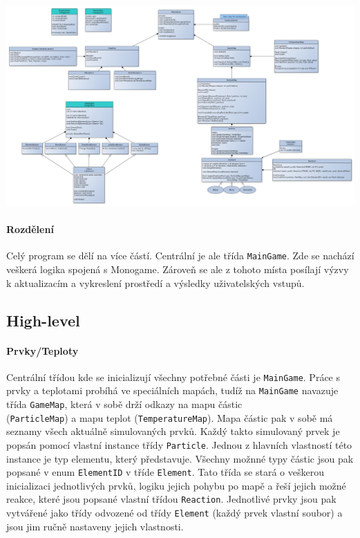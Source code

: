 \documentclass[a4paper, 12pt]{article}
\begin{document}
\begin{center}
    \hspace*{-80px}
    \includegraphics[width=1.4\linewidth]{GrainSim-graph.jpg}
\end{center}

\paragraph{Rozdělení}
Celý program se dělí na více částí. Centrální je ale třída \texttt{MainGame}.
Zde se nachází veškerá logika spojená s Monogame. Zároveň se ale z tohoto
místa posílají výzvy k aktualizacím a vykreslení prostředí a výsledky
uživatelských vstupů. 

\newpage
\subsection{High-level}
\paragraph{Prvky/Teploty}
Centrální třídou kde se inicializují všechny potřebné části je
\texttt{MainGame}. Práce s prvky a teplotami probíhá ve speciálních mapách,
tudíž na \texttt{MainGame} navazuje třída \texttt{GameMap}, která v sobě drží
odkazy na mapu částic \\(\texttt{ParticleMap}) a mapu teplot
(\texttt{TemperatureMap}). Mapa částic pak v sobě má seznamy všech aktuálně
simulovaných prvků. Každý takto simulovaný prvek je popsán pomocí vlastní
instance třídy \texttt{Particle}. Jednou z hlavních vlastností této instance je
typ elementu, který představuje. Všechny možnné typy částic jsou pak popsané v
enum \texttt{ElementID} v tříde \texttt{Element}. Tato třída se stará o
veškerou inicializaci jednotlivých prvků, logiku jejich pohybu po mapě a řeší
jejich možné reakce, které jsou popsané vlastní třídou \texttt{Reaction}.
Jednotlivé prvky jsou pak vytvářené jako třídy odvozené od třídy
\texttt{Element} (každý prvek vlastní soubor) a jsou jim ručně nastaveny jejich
vlastnosti.
\end{document}
